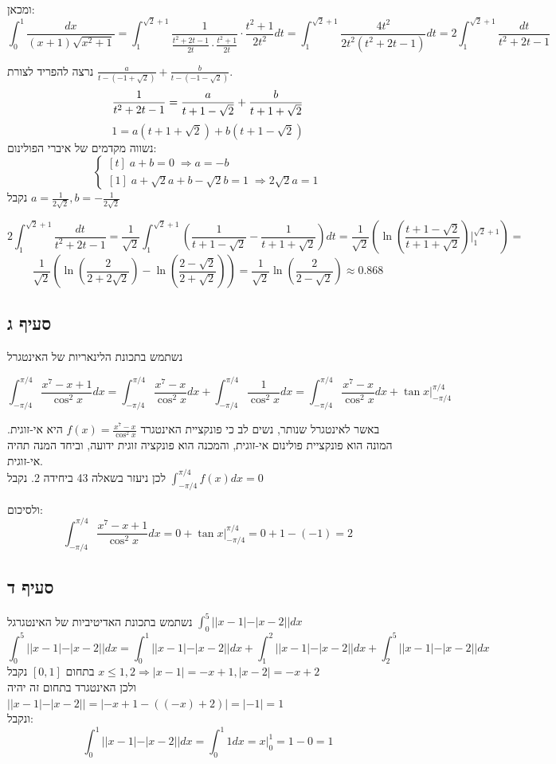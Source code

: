 \documentclass{article}
\begin{document}
ומכאן:
\[
    \int_0^1 \frac{dx}{(x+1)\sqrt{x^2+1}} =
    \int_1^{\sqrt{2}+1} \frac{1}{\frac{t^2+2t-1}{2t} \cdot \frac{t^2+1}{2t}} \cdot \frac{t^2+1}{2t^2}dt =
    \int_1^{\sqrt{2}+1} \frac{4t^2}{2t^2(t^2+2t-1)}dt =
    2 \int_1^{\sqrt{2}+1} \frac{dt}{t^2+2t-1}
\]

נרצה להפריד לצורת $\frac{a}{t-(-1+\sqrt{2})} + \frac{b}{t-(-1-\sqrt{2})}$.
\[
    \frac{1}{t^2+2t-1}=\frac{a}{t+1-\sqrt{2}} + \frac{b}{t+1+\sqrt{2}}                                \\
\]
\[
    1=a(t+1+\sqrt{2}) + b(t+1-\sqrt{2})
\]
נשווה מקדמים של איברי הפולינום:
\[
    \begin{cases}
        [t] \; a+b=0 \; \Rightarrow a=-b \\
        [1] \; a+\sqrt{2}a+b-\sqrt{2}b=1 \; \Rightarrow 2\sqrt{2}a=1
    \end{cases}
\]
נקבל $a=\frac{1}{2\sqrt{2}}, b=-\frac{1}{2\sqrt{2}}$

\[
    2 \int_1^{\sqrt{2}+1} \frac{dt}{t^2+2t-1} =
    \frac{1}{\sqrt{2}} \int_1^{\sqrt{2}+1}
    (\frac{1}{t+1-\sqrt{2}} - \frac{1}{t+1+\sqrt{2}})dt =
    \frac{1}{\sqrt{2}} (\ln(\frac{t+1-\sqrt{2}}{t+1+\sqrt{2}})\bigg|_1^{\sqrt{2}+1}) =
\]
\[
    \frac{1}{\sqrt{2}} (\ln(\frac{2}{2+2\sqrt{2}}) - \ln(\frac{2-\sqrt{2}}{2+\sqrt{2}})) =
    \frac{1}{\sqrt{2}} \ln(\frac{2}{2-\sqrt{2}})\approx 0.868
\]

\pagebreak

\subsection*{סעיף ג}

נשתמש בתכונת הלינאריות של האינטגרל

\[
    \int_{-\pi/4}^{\pi/4} \frac{x^7-x+1}{\cos^2x}dx =
    \int_{-\pi/4}^{\pi/4} \frac{x^7-x}{\cos^2x}dx + \int_{-\pi/4}^{\pi/4} \frac{1}{\cos^2x}dx =
    \int_{-\pi/4}^{\pi/4} \frac{x^7-x}{\cos^2x}dx + \tan x\bigg|_{-\pi/4}^{\pi/4}
\]

באשר לאינטגרל שנותר, נשים לב כי פונקציית האינטגרד $f(x) = \frac{x^7-x}{\cos^2x}$ היא אי-זוגית. המונה הוא פונקציית פולינום אי-זוגית, והמכנה הוא פונקציה זוגית ידועה, וביחד המנה תהיה אי-זוגית.\\
לכן ניעזר בשאלה 43 ביחידה 2. נקבל $\int_{-\pi/4}^{\pi/4} f(x)dx = 0$

ולסיכום:
\[
    \int_{-\pi/4}^{\pi/4} \frac{x^7-x+1}{\cos^2x}dx =
    0 + \tan x\bigg|_{-\pi/4}^{\pi/4} =
    0 + 1 - (-1) = 2
\]


\subsection*{סעיף ד}
נשתמש בתכונת האדיטיביות של האינטגרגל $\int_0^5 ||x-1|-|x-2||dx$
\[
    \int_0^5 ||x-1|-|x-2||dx =
    \int_0^1 ||x-1|-|x-2||dx + \int_1^2 ||x-1|-|x-2||dx + \int_2^5 ||x-1|-|x-2||dx
\]
בתחום $[0,1]$ נקבל $x\leq 1,2\Rightarrow |x-1|=-x+1, |x-2|=-x+2$ \\
ולכן האינטגרד בתחום זה יהיה $||x-1|-|x-2||=|-x+1-((-x)+2)|=|-1|=1$ \\
ונקבל: \[
    \int_0^1 ||x-1|-|x-2||dx =
    \int_0^1 1dx =
    x\bigg|_0^1 =
    1 - 0 = 1
\]
\end{document}
